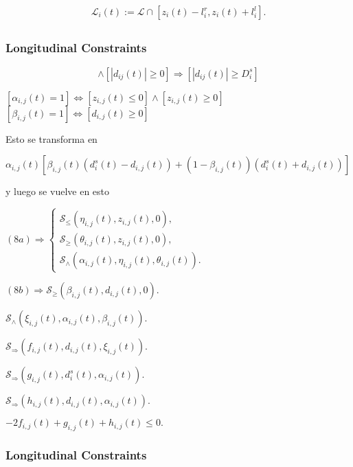 \begin{equation}
\mathcal{L}_i(t) := \mathcal{L} \cap[z_i(t)-l_i^r, z_i(t)+l_i^l].
\end{equation}

\subsection{}
\subsubsection{Longitudinal Constraints}


\begin{equation}
    [z_{i,j}(t)=0] \wedge [\left | d_{ij}(t) \right | \geq 0] \Rightarrow [\left | d_{ij}(t) \right | \geq D_i^s]
\end{equation}

$[\alpha_{i,j}(t) = 1] \Leftrightarrow [z_{i,j}(t) \leq 0] \wedge [z_{i,j}(t) \geq 0]$
$[\beta_{i,j}(t) = 1] \Leftrightarrow  [d_{i,j}(t) \geq 0]$


Esto se transforma en 

$\alpha _{i,j}(t)[\beta_{i,j}(t)(d^s_i(t)-d_{i,j}(t)) + (1-\beta_{i,j}(t))(d^s_i(t)+d_{i,j}(t) )]$

y luego se vuelve en esto

$(8a)\Rightarrow \left\{\begin{matrix}
\mathcal{S}_\leq (\eta _{i,j}(t),z_{i,j}(t),0),\\ 
\mathcal{S}_\geq (\theta _{i,j}(t),z_{i,j}(t),0),\\ 
\mathcal{S}_\wedge (\alpha_{i,j}(t),\eta _{i,j}(t), \theta_{i,j}(t)).
\end{matrix}\right.$

$(8b)\Rightarrow \mathcal{S}_\geq (\beta_{i,j}(t),d_{i,j}(t),0).$

$\mathcal{S}_\wedge (\xi_{i,j}(t),\alpha_{i,j}(t),\beta_{i,j}(t)).$

$\mathcal{S}_\Rightarrow (f_{i,j}(t),d_{i,j}(t),\xi_{i,j}(t)).$

$\mathcal{S}_\Rightarrow (g_{i,j}(t),d^s_i(t),\alpha_{i,j}(t)).$

$\mathcal{S}_\Rightarrow (h_{i,j}(t),d_{i,j}(t),\alpha_{i,j}(t)).$

$-2f_{i,j}(t)+g_{i,j}(t)+h_{i,j}(t) \leq 0.$

\subsubsection{Longitudinal Constraints}

